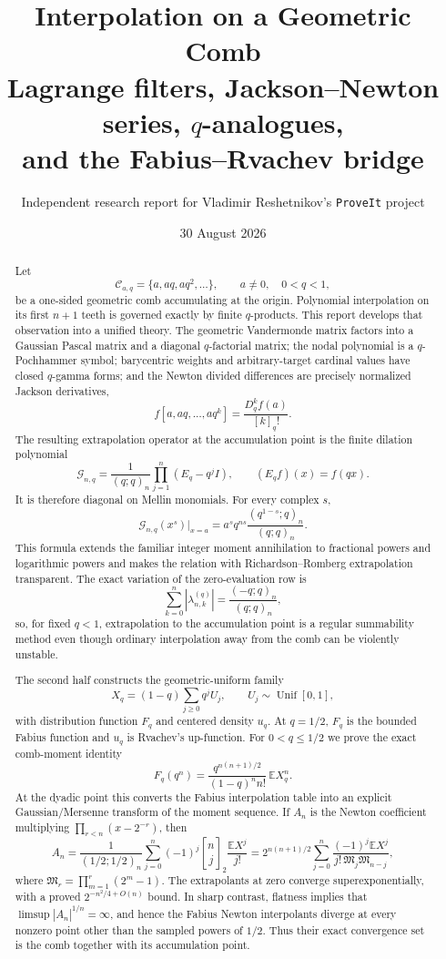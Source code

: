 \documentclass[11pt,a4paper,oneside]{article}
\title{\bfseries Interpolation on a Geometric Comb\\[0.4em]
\large Lagrange filters, Jackson--Newton series, $q$-analogues,\\
and the Fabius--Rvachev bridge}
\author{Independent research report for Vladimir Reshetnikov's \texttt{ProveIt} project}
\date{30 August 2026}
\theoremstyle{definition}
\theoremstyle{remark}
\newcommand{\E}{\mathbb E}
\newcommand{\qbinom}[3]{\genfrac{[}{]}{0pt}{}{#1}{#2}_{#3}}
\begin{document}
\maketitle

\begin{abstract}
Let
\[
  \mathcal C_{a,q}=\{a,aq,aq^2,\ldots\},\qquad a\ne0,\quad 0<q<1,
\]
be a one-sided geometric comb accumulating at the origin.  Polynomial
interpolation on its first $n+1$ teeth is governed exactly by finite
$q$-products.  This report develops that observation into a unified theory.
The geometric Vandermonde matrix factors into a Gaussian Pascal matrix and a
diagonal $q$-factorial matrix; the nodal polynomial is a $q$-Pochhammer
symbol; barycentric weights and arbitrary-target cardinal values have closed
$q$-gamma forms; and the Newton divided differences are precisely normalized
Jackson derivatives,
\[
 f[a,aq,\ldots,aq^k]=\frac{D_q^k f(a)}{[k]_q!}.
\]
The resulting extrapolation operator at the accumulation point is the finite
dilation polynomial
\[
 \mathcal G_{n,q}=\frac1{(q;q)_n}\prod_{j=1}^n(E_q-q^jI),
 \qquad (E_qf)(x)=f(qx).
\]
It is therefore diagonal on Mellin monomials.  For every complex $s$,
\[
 \mathcal G_{n,q}(x^s)\big|_{x=a}
 =a^s q^{ns}\frac{(q^{1-s};q)_n}{(q;q)_n}.
\]
This formula extends the familiar integer moment annihilation to fractional
powers and logarithmic powers and makes the relation with Richardson--Romberg
extrapolation transparent.  The exact variation of the zero-evaluation row is
\[
 \sum_{k=0}^n|\lambda_{n,k}^{(q)}|
 =\frac{(-q;q)_n}{(q;q)_n},
\]
so, for fixed $q<1$, extrapolation to the accumulation point is a regular
summability method even though ordinary interpolation away from the comb can
be violently unstable.

The second half constructs the geometric-uniform family
\[
 X_q=(1-q)\sum_{j\ge0}q^jU_j,
 \qquad U_j\sim\operatorname{Unif}[0,1],
\]
with distribution function $F_q$ and centered density $u_q$.  At $q=1/2$,
$F_q$ is the bounded Fabius function and $u_q$ is Rvachev's up-function.  For
$0<q\le1/2$ we prove the exact comb-moment identity
\[
 F_q(q^n)=\frac{q^{n(n+1)/2}}{(1-q)^n n!}\,\E X_q^n.
\]
At the dyadic point this converts the Fabius interpolation table into an
explicit Gaussian/Mersenne transform of the moment sequence.  If $A_n$ is the
Newton coefficient multiplying $\prod_{r<n}(x-2^{-r})$, then
\[
 A_n=\frac1{(1/2;1/2)_n}
 \sum_{j=0}^n(-1)^j\qbinom nj2\frac{\E X^j}{j!}
 =2^{n(n+1)/2}\sum_{j=0}^n
 \frac{(-1)^j\E X^j}{j!\,\mathfrak M_j\mathfrak M_{n-j}},
\]
where $\mathfrak M_r=\prod_{m=1}^r(2^m-1)$.  The extrapolants at zero converge
superexponentially, with a proved $2^{-n^2/4+O(n)}$ bound.  In sharp contrast,
flatness implies that $\limsup|A_n|^{1/n}=\infty$, and hence the Fabius
Newton interpolants diverge at every nonzero point other than the sampled
powers of $1/2$.  Thus their exact convergence set is the comb together with
its accumulation point.


\end{abstract}
\end{document}
